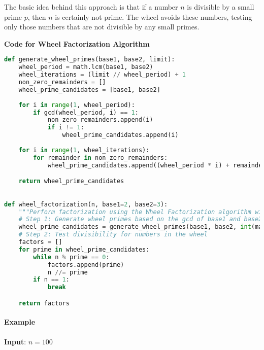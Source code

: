 \documentclass[12pt]{report}
\begin{document}
The basic idea behind this approach is that if a number $n$ is divisible by a small prime $p$, then $n$ is certainly not prime. The wheel avoids these numbers, testing only those numbers that are not divisible by any small primes.
\\
\begin{center}
    \textbf{Code for Wheel Factorization Algorithm}
\end{center}

\begin{lstlisting}[language=Python]
def generate_wheel_primes(base1, base2, limit):
    wheel_period = math.lcm(base1, base2)
    wheel_iterations = (limit // wheel_period) + 1
    non_zero_remainders = []
    wheel_prime_candidates = [base1, base2]
    
    for i in range(1, wheel_period):
        if gcd(wheel_period, i) == 1:
            non_zero_remainders.append(i)
            if i != 1:
                wheel_prime_candidates.append(i)
    
    for i in range(1, wheel_iterations):
        for remainder in non_zero_remainders:
            wheel_prime_candidates.append((wheel_period * i) + remainder)

    return wheel_prime_candidates
\end{lstlisting}

\clearpage

\begin{lstlisting}[language=Python]

def wheel_factorization(n, base1=2, base2=3):
    """Perform factorization using the Wheel Factorization algorithm with base1 and base2 bases."""
    # Step 1: Generate wheel primes based on the gcd of base1 and base2
    wheel_prime_candidates = generate_wheel_primes(base1, base2, int(math.sqrt(n)) + 1)
    # Step 2: Test divisibility for numbers in the wheel
    factors = []
    for prime in wheel_prime_candidates:
        while n % prime == 0:
            factors.append(prime)
            n //= prime
        if n == 1:
            break

    return factors
\end{lstlisting}

\paragraph{Example}

\textbf{Input}: $n = 100$  
\end{document}
